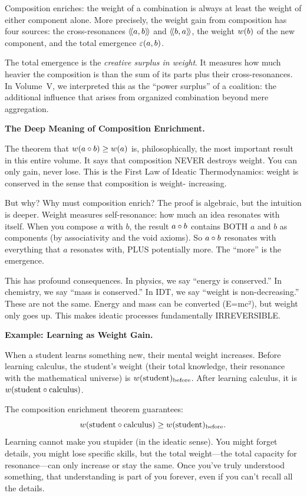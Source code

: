 \begin{interpretation}
Composition enriches: the weight of a combination is always at least the weight
of either component alone. More precisely, the weight gain from composition
has four sources: the cross-resonances $\langle\!\langle a, b \rangle\!\rangle$ and $\langle\!\langle b, a \rangle\!\rangle$, the weight
$w(b)$ of the new component, and the total emergence $\varepsilon(a,b)$.

The total emergence is the \emph{creative surplus in weight}. It measures how
much heavier the composition is than the sum of its parts plus their
cross-resonances. In Volume~V, we interpreted this as the ``power surplus'' of
a coalition: the additional influence that arises from organized combination
beyond mere aggregation.

\textbf{The Deep Meaning of Composition Enrichment.}

The theorem that $w(a \circ b) \geq w(a)$ is, philosophically,
the most important result in this entire volume. It says that composition NEVER
destroys weight. You can only gain, never lose. This is the First Law of Ideatic
Thermodynamics: weight is conserved in the sense that composition is weight-
increasing.

But why? Why must composition enrich? The proof is algebraic, but the intuition
is deeper. Weight measures self-resonance: how much an idea resonates with itself.
When you compose $a$ with $b$, the result $a \circ b$ contains BOTH $a$ and
$b$ as components (by associativity and the void axioms). So $a \circ b$
resonates with everything that $a$ resonates with, PLUS potentially more. The
``more'' is the emergence.

This has profound consequences. In physics, we say ``energy is conserved.'' In
chemistry, we say ``mass is conserved.'' In IDT, we say ``weight is non-decreasing.''
These are not the same. Energy and mass can be converted (E=mc²), but weight
only goes up. This makes ideatic processes fundamentally IRREVERSIBLE.

\textbf{Example: Learning as Weight Gain.}

When a student learns something new, their mental weight increases. Before learning
calculus, the student's weight (their total knowledge, their resonance with the
mathematical universe) is $w(\text{student})_{\text{before}}$. After
learning calculus, it is $w(\text{student} \circ \text{calculus})$.

The composition enrichment theorem guarantees:
\[
  w(\text{student} \circ \text{calculus}) \geq w(\text{student})_{\text{before}}.
\]
Learning cannot make you stupider (in the ideatic sense). You might forget details,
you might lose specific skills, but the total weight---the total capacity for
resonance---can only increase or stay the same. Once you've truly understood
something, that understanding is part of you forever, even if you can't recall
all the details.


\end{interpretation}
